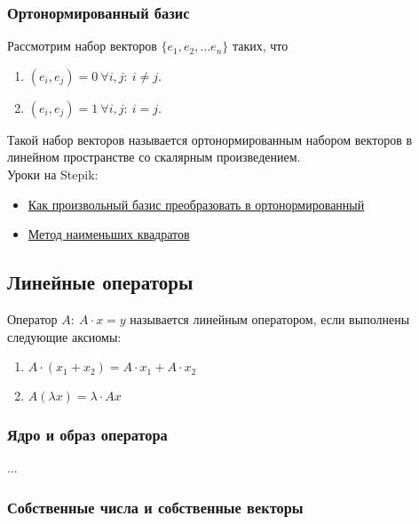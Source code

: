\documentclass{article}
\begin{document}
\subsubsection{Ортонормированный базис}

Рассмотрим набор векторов $\{e_1, e_2, \dots e_n\}$ таких, что

\begin{enumerate}
	\item $(e_i, e_j) = 0 \ \forall i, j: \ i \ne j$.
	\item $(e_i, e_j) = 1 \ \forall i, j: \ i = j$.
\end{enumerate}

Такой набор векторов называется ортонормированным набором векторов в линейном пространстве со скалярным произведением. \\

Уроки на Stepik:

\begin{itemize}
	\item \href{https://stepik.org/lesson/9584/step/6?unit=23534}{Как произвольный базис преобразовать в ортонормированный}
	\item \href{https://stepik.org/lesson/9584/step/13?unit=23534}{Метод наименьших квадратов}
\end{itemize}

\subsection{Линейные операторы}

Оператор $A: \ A \cdot x = y$ называется линейным оператором, если выполнены следующие аксиомы:

\begin{enumerate}
	\item $A \cdot (x_1 + x_2) = A \cdot x_1 + A \cdot x_2$
	\item $A (\lambda x) = \lambda \cdot Ax$
\end{enumerate}

\subsubsection{Ядро и образ оператора}

...

\subsubsection{Собственные числа и собственные векторы}
\end{document}
